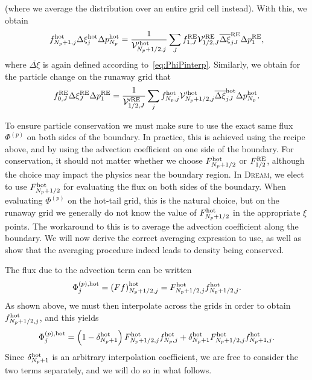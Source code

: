 \documentclass{notes}
\newcommand{\DREAM}{\textsc{Dream}}
\newcommand{\Vp}{\mathcal{V}'}
\begin{document}
    (where we average the distribution over an entire grid cell instead).
    With this, we obtain
    \begin{equation}\label{eq:fhotTransf}
        f^{\rm hot}_{N_p+1,j}\Delta\xi_j^{\rm hot}\Delta p_{N_p}^{\rm hot} =
            \frac{1}{\Vp^{\rm hot}_{N_p+1/2,j}} \sum_J
                f_{1,J}^{\rm RE} \Vp^{\rm RE}_{1/2,J} \overline{\Delta\xi}_{jJ}^{\rm RE}\Delta p_1^{\rm RE},
    \end{equation}
    where $\overline{\Delta\xi}$ is again defined according
    to~\eqref{eq:PhiPinterp}. Similarly, we obtain for the particle change on
    the runaway grid that
    \begin{equation}\label{eq:crossFlux_fRE0}
        f^{\rm RE}_{0,J}\Delta\xi_J^{\rm RE}\Delta p_1^{\rm RE} =
            \frac{1}{\Vp^{\rm RE}_{1/2,J}} \sum_j
                f_{N_p,j}^{\rm hot} \Vp^{\rm hot}_{N_p+1/2,j} \overline{\Delta\xi}_{jJ}^{\rm hot}\Delta p_{N_p}^{\rm hot}.
    \end{equation}

    To ensure particle conservation we must make sure to use the exact same flux
    $\Phi^{(p)}$ on both sides of the boundary. In practice, this is achieved
    using the recipe above, and by using the advection coefficient on one side
    of the boundary. For conservation, it should not matter whether we choose
    $F_{N_p+1/2}^{\rm hot}$ or $F_{1/2}^{\rm RE}$, although the choice may
    impact the physics near the boundary region. In \DREAM, we elect to use
    $F_{N_p+1/2}^{\rm hot}$ for evaluating the flux on both sides of the
    boundary. When evaluating $\Phi^{(p)}$ on the hot-tail grid, this is the
    natural choice, but on the runaway grid we generally do not know the value
    of $F^{\rm hot}_{N_p+1/2}$ in the appropriate $\xi$ points. The workaround
    to this is to average the advection coefficient along the boundary. We will
    now derive the correct averaging expression to use, as well as show that
    the averaging procedure indeed leads to density being conserved.

    The flux due to the advection term can be written
    \begin{equation}
        \Phi_j^{(p),{\rm hot}} = \left( Ff \right)^{\rm hot}_{N_p+1/2,j} = F_{N_p+1/2,j}^{\rm hot} f^{\rm hot}_{N_p+1/2,j}.
    \end{equation}
    As shown above, we must then interpolate across the grids in order to obtain
    $f^{\rm hot}_{N_p+1/2,j}$, and this yields
    \begin{equation}\label{eq:PhiPhot}
        \Phi^{(p),{\rm hot}}_j =
            \left(1-\delta^{\rm hot}_{N_p+1}\right) F^{\rm hot}_{N_p+1/2,j} f_{N_p,j}^{\rm hot} +
            \delta^{\rm hot}_{N_p+1} F^{\rm hot}_{N_p+1/2,j} f_{N_p+1,j}^{\rm hot}.
    \end{equation}
    Since $\delta^{\rm hot}_{N_p+1}$ is an arbitrary interpolation coefficient,
    we are free to consider the two terms separately, and we will do so in what
    follows.
\end{document}
